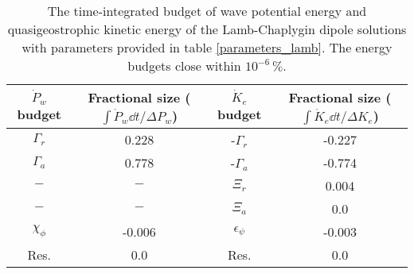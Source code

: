 \begin{table}
\begin{center}
    \caption{The time-integrated budget of wave potential energy and quasigeostrophic                kinetic energy of the Lamb-Chaplygin dipole solutions with parameters provided in table \ref{parameters_lamb}. The energy budgets close within $10^{-6}\,\%$.\label{table1}}
\begin{tabular}{c|c|c|c}
\hline
$\dot{P}_w$ budget & Fractional size ($\int\dot{P}_w \dd t/\Delta P_w $) & $\dot{K}_e$ budget  & Fractional size ($\int\dot{K}_e \dd t/\Delta K_e$)\\
\hline
$\Gamma_r$ & 0.228 & -$\Gamma_r$ & -0.227 \\
$\Gamma_a$ & 0.778 & -$\Gamma_a$ & -0.774 \\
$-$ & $-$ & $\Xi_r$ & 0.004 \\
$-$ & $-$ & $\Xi_a$ & 0.0 \\
$\chi_\phi$ & -0.006 & $\epsilon_\psi$ & -0.003 \\
Res. & 0.0 & Res. & 0.0 \\
\end{tabular}
\end{center}
\end{table}
